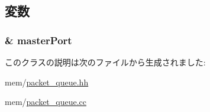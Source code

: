 \subsection{変数}
\hypertarget{classMasterPacketQueue_a43650d24b03c3739d70cd1b9500d1d9b}{
\subsubsection[{masterPort}]{\& {\bf masterPort}}}
\label{classMasterPacketQueue_a43650d24b03c3739d70cd1b9500d1d9b}


このクラスの説明は次のファイルから生成されました:\begin{DoxyCompactItemize}
\item 
mem/\hyperlink{packet__queue_8hh}{packet\_\-queue.hh}\item 
mem/\hyperlink{packet__queue_8cc}{packet\_\-queue.cc}\end{DoxyCompactItemize}
